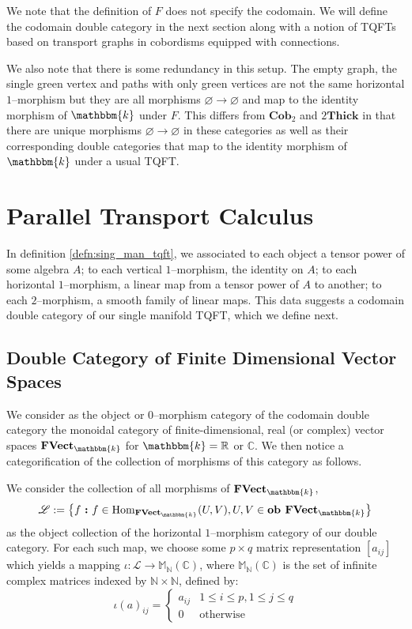 \documentclass{amsart}
\newcommand{\M}{\mathbb{M}}
\newcommand{\N}{\mathbb{N}}
\newcommand{\R}{\mathbb{R}}
\newcommand{\C}{\mathbb{C}}
\newcommand{\K}{\mathbbm{k}}
\newcommand{\s}{\mathscr}
\renewcommand{\to}[1][]{\stackrel{#1}{\longrightarrow}}
\newcommand{\curly}[1]{\left\{ #1 \right\}}
\newcommand{\set}[2][]{\ifthenelse{\equal{#1}{}}
                                  {\curly{#2}}
                                  {\curly{#1\ \textbf{:}\ #2}}}
\newcommand{\Cob}{\textbf{Cob}}
\newcommand{\FVect}{\textbf{FVect}}
\newcommand{\Thick}{\textbf{Thick}}
\newcommand{\Hom}{\text{Hom}}
\newcommand{\Ob}{\textbf{ob }}
\numberwithin{thm}{section}
\theoremstyle{definition}
\begin{document}
We note that the definition of $F$ does not specify the codomain. We will define
the codomain double category in the next section along with a notion of TQFTs
based on transport graphs in cobordisms equipped with connections.

We also note that there is some redundancy in this setup. The empty graph, the
single green vertex and paths with only green vertices are not the same
horizontal $1$--morphism but they are all morphisms
$\varnothing \to \varnothing$ and map to the identity morphism of $\K$ under
$F$. This differs from $\Cob_2$ and $2\Thick$ in that there are unique
morphisms $\varnothing \to \varnothing$ in these categories as well as their
corresponding double categories that map to the identity morphism of $\K$ under
a usual TQFT.


%

\section{Parallel Transport Calculus}

In definition \ref{defn:sing_man_tqft}, we associated to each object a tensor
power of some algebra $A$; to each vertical $1$--morphism, the identity on $A$;
to each horizontal $1$--morphism, a linear map from a tensor power of $A$ to
another; to each $2$--morphism, a smooth family of linear maps. This data
suggests a codomain double category of our single manifold TQFT, which we define
next.

%

\subsection{Double Category of Finite Dimensional Vector Spaces}

We consider as the object or $0$--morphism category of the codomain double
category the monoidal category of finite-dimensional, real (or complex) vector
spaces $\FVect_{\K}$ for $\K = \R$ or $\C$. We then notice a categorification
of the collection of morphisms of this category as follows.

We consider the collection of all morphisms of $\FVect_{\K}$,
\[
  \s{L} := \set[f]{f \in \Hom_{\FVect_{\K}}(U, V), U, V \in \Ob \FVect_{\K}}
\]
as the object collection of the horizontal $1$--morphism category of our double
category. For each such map, we choose some $p \times q$ matrix representation
$[a_{ij}]$ which yields a mapping $\iota : \s{L} \to \M_{\N}(\C)$, where
$\M_{\N}(\C)$ is the set of infinite complex matrices indexed by $\N \times \N$,
defined by:
\[
  \iota(a)_{ij} = \begin{cases}
    a_{ij} & 1 \leq i \leq p, 1 \leq j \leq q \\
    0      & \text{otherwise}
  \end{cases}
\]
\end{document}
